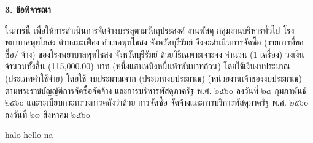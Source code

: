 \documentclass[12pt]{article}
\begin{document}
\vspace{0.5cm}
\textbf{3. ข้อพิจารณา}

ในการนี้ เพื่อให้การดำเนินการจัดจ้างบรรลุตามวัตถุประสงค์ งานพัสดุ กลุ่มงานบริหารทั่วไป
โรงพยาบาลพุทไธสง ตำบลมะเฟือง อำเภอพุทไธสง จังหวัดบุรีรัมย์ จึงจะดำเนินการจัดซื้อ (รายการที่ขอซื้อ/
จ้าง) ของโรงพยาบาลพุทไธสง จังหวัดบุรีรัมย์ ด้วยวิธีเฉพาะเจาะจง จำนวน (1 เครื่อง) วงเงินจำนวนทั้งสิ้น
(115,000.00) บาท (หนึ่งแสนหนึ่งหมื่นห้าพันบาทถ้วน) โดยใช้เงินงบประมาณ (ประเภทค่าใช้จ่าย) โดยใช้
งบประมาณจาก (ประเภทงบประมาณ) (หน่วยงานเจ้าของงบประมาณ) ตามพระราชบัญญัติการจัดซื้อจัดจ้าง
และการบริหารพัสดุภาครัฐ พ.ศ. ๒๕๖๐ ลงวันที่ ๒๔ กุมภาพันธ์ ๒๕๖๐ และระเบียบกระทรวงการคลังว่าด้วย
การจัดซื้อ จัดจ้างและการบริการพัสดุภาครัฐ พ.ศ. ๒๕๖๐ ลงวันที่ ๒๓ สิงหาคม ๒๕๖๐

halo hello na
\end{document}
